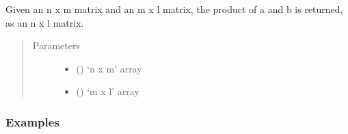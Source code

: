 \documentclass[letterpaper,10pt,english]{sphinxmanual}
\begin{document}
\begin{fulllineitems}
Given  an n x m matrix and  an m x l matrix, the product of a and b
is returned, as an n x l matrix.
\begin{quote}\begin{description}
\item[{Parameters}] \leavevmode\begin{itemize}
\item {} 
 () \textendash{} ‘n x m’ array

\item {} 
 () \textendash{} ‘m x l’ array

\end{itemize}

\end{description}\end{quote}
\subsubsection*{Examples}

\begin{sphinxVerbatim}[commandchars=\\\{\}]
  \PYG{p}{[}\PYG{p}{[} \PYG{p}{]} \PYG{p}{[} \PYG{p}{]}\PYG{p}{]}
  \PYG{p}{[}\PYG{p}{[}\PYG{p}{]}\PYG{p}{[}\PYG{p}{]}\PYG{p}{]}
   
  \PYG{p}{[}\PYG{p}{[} \PYG{p}{]} \PYG{p}{[} \PYG{p}{]}\PYG{p}{]}
   
\end{sphinxVerbatim}

\end{fulllineitems}
\end{document}

